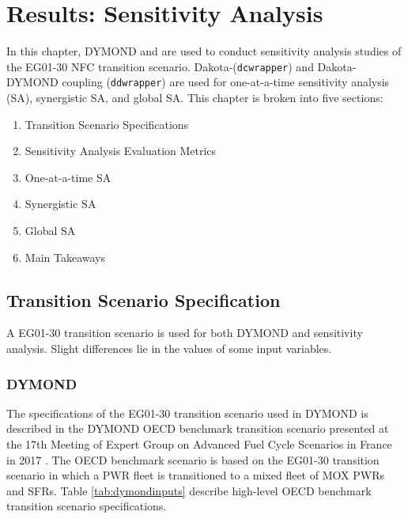 \chapter{Results: Sensitivity Analysis}
In this chapter, DYMOND and \Cyclus are used to conduct 
sensitivity analysis studies of the 
EG01-30 \gls{NFC} transition scenario. 
Dakota-\Cyclus (\texttt{dcwrapper}) 
and Dakota-DYMOND coupling (\texttt{ddwrapper})
are used for 
one-at-a-time sensitivity analysis (SA), synergistic 
SA, and global SA. 
This chapter is broken into five sections: 
\begin{enumerate}
    \item Transition Scenario Specifications 
    \item Sensitivity Analysis Evaluation Metrics 
    \item One-at-a-time \gls{SA}
    \item Synergistic \gls{SA}
    \item Global \gls{SA}
    \item Main Takeaways 
\end{enumerate}

\section{Transition Scenario Specification}
A EG01-30 transition scenario is used for 
both DYMOND and \Cyclus sensitivity analysis. 
Slight differences lie in the values of some input variables. 

\subsection{DYMOND}
The specifications of the EG01-30 transition scenario used in DYMOND 
is described in the DYMOND OECD benchmark transition 
scenario presented at the 17th Meeting of Expert Group on Advanced 
Fuel Cycle Scenarios in France in 2017 
\cite{oecd_nuclear_energy_agency_wpfc_nodate}. 
The OECD benchmark scenario is based on the EG01-30 transition scenario 
in which a \gls{PWR} fleet is transitioned to
a mixed fleet of \gls{MOX} \glspl{PWR} and \glspl{SFR}. 
Table \ref{tab:dymondinputs} describe high-level OECD benchmark transition 
scenario specifications. 

